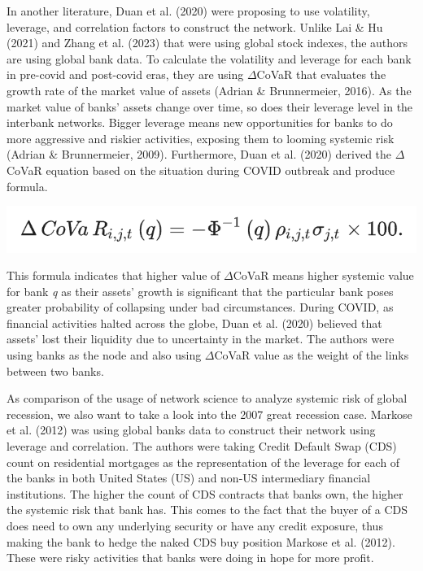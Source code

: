 \documentclass[a4paper,11pt]{article}
\begin{document}
In another literature, Duan et al. (2020) were proposing to use volatility, leverage, and correlation factors to construct the network. Unlike Lai \& Hu (2021) and Zhang et al. (2023) that were using global stock indexes, the authors are using global bank data. To calculate the volatility and leverage for each bank in pre-covid and post-covid eras, they are using $\Delta$CoVaR that evaluates the growth rate of the market value of assets (Adrian \& Brunnermeier, 2016). As the market value of banks’ assets change over time, so does their leverage level in the interbank networks. Bigger leverage means new opportunities for banks to do more aggressive and riskier activities, exposing them to looming systemic risk (Adrian \& Brunnermeier, 2009). Furthermore, Duan et al. (2020) derived the $\Delta$CoVaR equation based on the situation during COVID outbreak and produce formula.

\includegraphics[scale=0.7]{covar.png}

This formula indicates that higher value of $\Delta$CoVaR means higher systemic value for bank \textit{q} as their assets’ growth is significant that the particular bank poses greater probability of collapsing under bad circumstances. During COVID, as financial activities halted across the globe, Duan et al. (2020) believed that assets’ lost their liquidity due to uncertainty in the market. The authors were using banks as the node and also using $\Delta$CoVaR value as the weight of the links between two banks.

As comparison of the usage of network science to analyze systemic risk of global recession, we also want to take a look into the 2007 great recession case. Markose et al. (2012) was using global banks data to construct their network using leverage and correlation. The authors were taking Credit Default Swap (CDS) count on residential mortgages as the representation of the leverage for each of the banks in both United States (US) and non-US intermediary financial institutions. The higher the count of CDS contracts that banks own, the higher the systemic risk that bank has. This comes to the fact that the buyer of a CDS does need to own any underlying security or have any credit exposure, thus making the bank to hedge the naked CDS buy position Markose et al. (2012). These were risky activities that banks were doing in hope for more profit.
\end{document}
